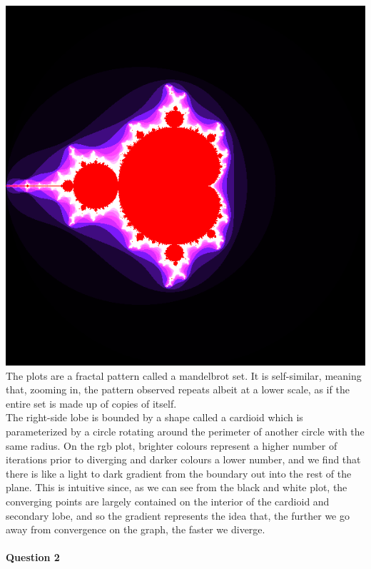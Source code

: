 \documentclass[11pt]{article}
\begin{document}
\includegraphics[scale = 0.5]{plot_rgb.png}\\
The plots are a fractal pattern called a mandelbrot set. It is self-similar,
meaning that, zooming in, the pattern observed repeats albeit at a lower scale,
as if the entire set is made up of copies of itself.\\
The right-side lobe is bounded by a shape called a cardioid which is parameterized by a circle rotating around the perimeter of another circle with the same radius. On the rgb plot, brighter colours represent a higher number of iterations
prior to diverging and darker colours a lower number,  and we find that there is like a light to dark gradient
from the boundary out into the rest of the plane. This is intuitive since, as we can see from the black and white plot, the converging points are largely
contained on the interior of the cardioid and secondary lobe, and so the gradient represents the idea that, the further we go away from convergence on the graph, the faster we diverge.\\
\\
{\textbf{Question 2}}\\
\end{document}
